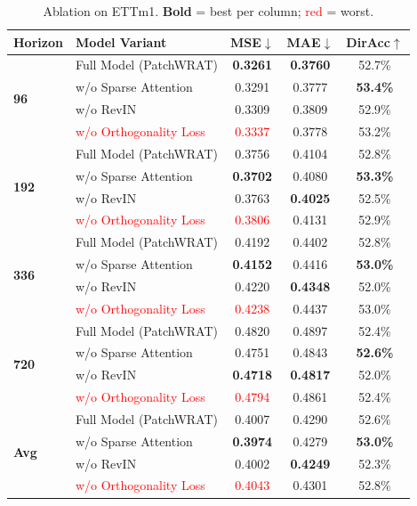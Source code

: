 \documentclass[11pt, letterpaper]{article}
\begin{document}
\begin{table}[H]
\centering
\caption{Ablation on ETTm1. \textbf{Bold} = best per column; \textcolor{red}{red} = worst.}
\label{tab:ablation}
\renewcommand{\arraystretch}{1.35}
\sffamily
\begin{tabular}{@{}llccc@{}}
\toprule
\textbf{Horizon} & \textbf{Model Variant} & \textbf{MSE}$\downarrow$ &
  \textbf{MAE}$\downarrow$ & \textbf{DirAcc}$\uparrow$ \\
\midrule
\multirow{4}{*}{\textbf{96}}
  & Full Model (PatchWRAT)    & \textbf{0.3261} & \textbf{0.3760} & 52.7\% \\
  & w/o Sparse Attention      & 0.3291 & 0.3777 & \textbf{53.4\%} \\
  & w/o RevIN                 & 0.3309 & 0.3809 & 52.9\% \\
  & \textcolor{red}{w/o Orthogonality Loss} & \textcolor{red}{0.3337} & 0.3778 & 53.2\% \\
\midrule
\multirow{4}{*}{\textbf{192}}
  & Full Model (PatchWRAT)    & 0.3756 & 0.4104 & 52.8\% \\
  & w/o Sparse Attention      & \textbf{0.3702} & 0.4080 & \textbf{53.3\%} \\
  & w/o RevIN                 & 0.3763 & \textbf{0.4025} & 52.5\% \\
  & \textcolor{red}{w/o Orthogonality Loss} & \textcolor{red}{0.3806} & 0.4131 & 52.9\% \\
\midrule
\multirow{4}{*}{\textbf{336}}
  & Full Model (PatchWRAT)    & 0.4192 & 0.4402 & 52.8\% \\
  & w/o Sparse Attention      & \textbf{0.4152} & 0.4416 & \textbf{53.0\%} \\
  & w/o RevIN                 & 0.4220 & \textbf{0.4348} & 52.0\% \\
  & \textcolor{red}{w/o Orthogonality Loss} & \textcolor{red}{0.4238} & 0.4437 & 53.0\% \\
\midrule
\multirow{4}{*}{\textbf{720}}
  & Full Model (PatchWRAT)    & 0.4820 & 0.4897 & 52.4\% \\
  & w/o Sparse Attention      & 0.4751 & 0.4843 & \textbf{52.6\%} \\
  & w/o RevIN                 & \textbf{0.4718} & \textbf{0.4817} & 52.0\% \\
  & \textcolor{red}{w/o Orthogonality Loss} & \textcolor{red}{0.4794} & 0.4861 & 52.4\% \\
\midrule
\multirow{4}{*}{\textbf{Avg}}
  & Full Model (PatchWRAT)    & 0.4007 & 0.4290 & 52.6\% \\
  & w/o Sparse Attention      & \textbf{0.3974} & 0.4279 & \textbf{53.0\%} \\
  & w/o RevIN                 & 0.4002 & \textbf{0.4249} & 52.3\% \\
  & \textcolor{red}{w/o Orthogonality Loss} & \textcolor{red}{0.4043} & 0.4301 & 52.8\% \\
\bottomrule
\end{tabular}
\end{table}
\end{document}
